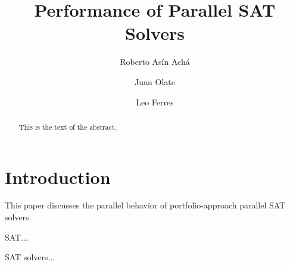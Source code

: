 \documentclass{llncs}
\begin{document}



\newcommand{\barc}{Barelogic$^S$}
\title{Performance of Parallel SAT Solvers}

\author{Roberto As\'in Ach\'a \and Juan Olate  \and Leo Ferres }



\maketitle

\begin{abstract}
This is the text of the abstract.
\end{abstract}

\section{Introduction}

This paper discusses the parallel behavior of portfolio-approach
parallel SAT solvers.

SAT...

SAT solvers...
\end{document}
